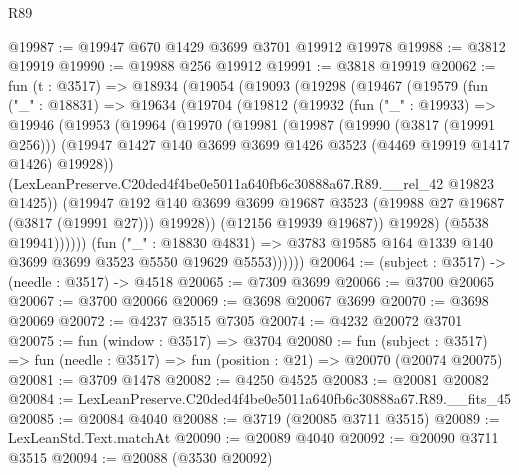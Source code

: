 \begin{lexlean}{R89}
\begin{coremodule}
@19987 := @19947 @670 @1429 @3699 @3701 @19912 @19978
@19988 := @3812 @19919
@19990 := @19988 @256 @19912
@19991 := @3818 @19919
@20062 := fun (t : @3517) =>
  @18934
    (@19054
      (@19093
        (@19298
          (@19467
            (@19579
              (fun ("_" : @18831) =>
              @19634
                (@19704
                  (@19812
                    (@19932
                      (fun ("_" : @19933) =>
                      @19946
                        (@19953
                          (@19964
                            (@19970
                              (@19981
                                (@19987
                                  (@19990 (@3817 (@19991 @256)))
                                  (@19947
                                    @1427
                                    @140
                                    @3699
                                    @3699
                                    @1426
                                    @3523
                                    (@4469 @19919 @1417 @1426)
                                    @19928))
                                (LexLeanPreserve.C20ded4f4be0e5011a640fb6c30888a67.R89.__rel_42
                                  @19823
                                  @1425))
                              (@19947
                                @192
                                @140
                                @3699
                                @3699
                                @19687
                                @3523
                                (@19988 @27 @19687 (@3817 (@19991 @27)))
                                @19928))
                            (@12156 @19939 @19687))
                          @19928)
                        (@5538 @19941))))))
              (fun ("_" : @18830 @4831) =>
              @3783 @19585 @164 @1339 @140 @3699 @3699 @3523 @5550 @19629 @5553))))))
@20064 := (subject : @3517) -> (needle : @3517) -> @4518
@20065 := @7309 @3699
@20066 := @3700 @20065
@20067 := @3700 @20066
@20069 := @3698 @20067 @3699
@20070 := @3698 @20069
@20072 := @4237 @3515 @7305
@20074 := @4232 @20072 @3701
@20075 := fun (window : @3517) => @3704
@20080 := fun (subject : @3517) =>
  fun (needle : @3517) => fun (position : @21) => @20070 (@20074 @20075)
@20081 := @3709 @1478
@20082 := @4250 @4525
@20083 := @20081 @20082
@20084 := LexLeanPreserve.C20ded4f4be0e5011a640fb6c30888a67.R89.__fits_45
@20085 := @20084 @4040
@20088 := @3719 (@20085 @3711 @3515)
@20089 := LexLeanStd.Text.matchAt
@20090 := @20089 @4040
@20092 := @20090 @3711 @3515
@20094 := @20088 (@3530 @20092)

\end{coremodule}
\end{lexlean}
